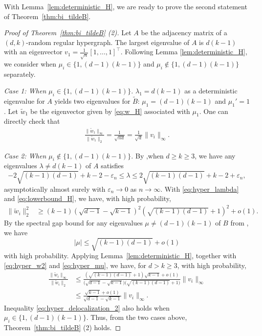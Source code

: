 \documentclass[11pt,reqno]{amsart}
\theoremstyle{definition}
\begin{document}
With Lemma~\ref{lem:deterministic_H}, we are ready to prove the second statement of Theorem~\ref{thm:bi_tildeB}.
\begin{proof}[Proof of Theorem~\ref{thm:bi_tildeB} (2)]
 Let $A$ be the adjacency matrix of a $(d,k)$-random regular hypergraph. The largest eigenvalue of $A$ is $d(k-1)$ with an eigenvector $v_1=\frac{1}{\sqrt n}[1,\dots,1]^\top$.   Following Lemma \ref{lem:deterministic_H}, we consider when $ \mu_i\in\{1,(d-1)(k-1)\}$ and $ \mu_i\notin\{1,(d-1)(k-1)\}$ separately.


\textit{Case 1: When $\mu_i\in\{1,(d-1)(k-1)\}$.}
$\lambda_1=d(k-1)$ as a deterministic eigenvalue for $A$ yields two eigenvalues for $\tilde B$: $\mu_1=(d-1)(k-1)$ and $\mu_1'=1$. Let  $\tilde w_1$ be the eigenvector given by \eqref{eq:w_H} associated with $\mu_1$. One can directly check that 
      \begin{align}
          \frac{ \|\tilde w_1\|_{\infty}}{\|\tilde w_1\|_2}= \frac{1}{\sqrt{nd}}=\frac{1}{\sqrt{d}}\|v_i\|_{\infty}.
      \end{align}

\textit{Case 2: When $\mu_i\notin\{1,(d-1)(k-1)\}$.} By \cite[Theorem 11]{dumitriu2021spectra},when $d\geq k\geq 3$, we have any eigenvalues $ \lambda \neq d(k-1)$ of $A$ satisfies \begin{equation}\label{eq:hyper_lambda}
   -2 \sqrt{(k-1)(d-1)} +k-2 - \varepsilon_n  \leq \lambda  \leq 2 \sqrt{(k-1)(d-1)} +k-2 + \varepsilon_n,
\end{equation}
asymptotically almost surely with $\varepsilon_n \rightarrow 0 $ as $ n \rightarrow \infty$. With \eqref{eq:hyper_lambda} and  \eqref{eq:lowerbound_H}, we have, with high probability, \begin{align}
    \|\tilde w_i\|_2^2 &\geq (k-1)(\sqrt{d-1}-\sqrt{k-1})^2(\sqrt{(k-1)(d-1)}+1)^2+o(1) \label{eq:hyper_w2}.
\end{align}
By the spectral gap bound for any eigenvalues $\mu \neq (d-1)(k-1)$ of $ B$ from \cite[Theorem 5.5]{dumitriu2021spectra}, we have \begin{equation}\label{eq:hyper_mu}
    |\mu| \leq \sqrt{(k-1)(d-1)}+o(1)
\end{equation}
with high probability. 
{Applying Lemma~\ref{lem:deterministic_H}, together with} \eqref{eq:hyper_w2} and \eqref{eq:hyper_mu}, we have, for $ d > k \geq 3$, with high probability, 
\begin{align}
    \frac{ \|\tilde w_i\|_{\infty}}{\|\tilde w_i\|_2} &\leq \frac{ ( \sqrt{(k-1)(d-1)} +1 ) \sqrt{k-1} +o(1)}{ \big( \sqrt{d-1 } - \sqrt{k-1} \big) \big( \sqrt{(k-1)(d-1)} +1 
    \big)  } \|v_i\|_{\infty}   \\
    &\leq \frac{  \sqrt{k-1}+o(1) }{  \sqrt{d-1 } - \sqrt{k-1}  } \|v_i\|_{\infty}  \label{eq:hyper_delocalization_2}.
\end{align}
Inequality \eqref{eq:hyper_delocalization_2} also holds when $\mu_i\in\{1,(d-1)(k-1)\}$. Thus, from the two cases above, Theorem~\ref{thm:bi_tildeB} (2) holds.
\end{proof}
\end{document}
